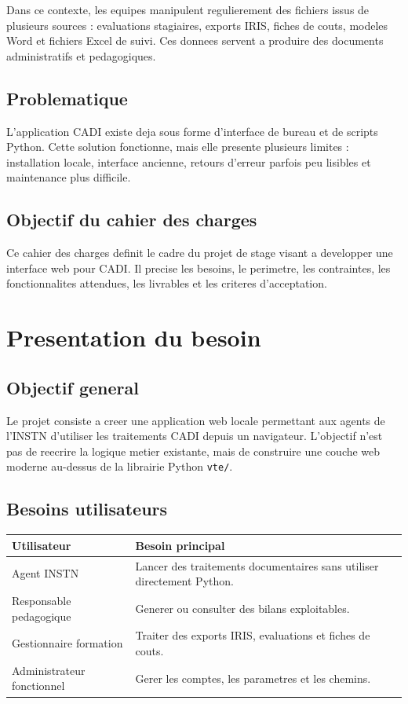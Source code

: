 \documentclass[11pt,a4paper]{report}
\begin{document}
Dans ce contexte, les equipes manipulent regulierement des fichiers issus de plusieurs sources : evaluations stagiaires, exports IRIS, fiches de couts, modeles Word et fichiers Excel de suivi. Ces donnees servent a produire des documents administratifs et pedagogiques.

\section{Problematique}
L'application CADI existe deja sous forme d'interface de bureau et de scripts Python. Cette solution fonctionne, mais elle presente plusieurs limites : installation locale, interface ancienne, retours d'erreur parfois peu lisibles et maintenance plus difficile.

\section{Objectif du cahier des charges}
Ce cahier des charges definit le cadre du projet de stage visant a developper une interface web pour CADI. Il precise les besoins, le perimetre, les contraintes, les fonctionnalites attendues, les livrables et les criteres d'acceptation.

\chapter{Presentation du besoin}

\section{Objectif general}
Le projet consiste a creer une application web locale permettant aux agents de l'INSTN d'utiliser les traitements CADI depuis un navigateur. L'objectif n'est pas de reecrire la logique metier existante, mais de construire une couche web moderne au-dessus de la librairie Python \texttt{vte/}.

\section{Besoins utilisateurs}
\begin{longtable}{L{0.28\textwidth} L{0.62\textwidth}}
\toprule
{}
\textbf{Utilisateur} & \textbf{Besoin principal} \\
\midrule
Agent INSTN & Lancer des traitements documentaires sans utiliser directement Python. \\
Responsable pedagogique & Generer ou consulter des bilans exploitables. \\
Gestionnaire formation & Traiter des exports IRIS, evaluations et fiches de couts. \\
Administrateur fonctionnel & Gerer les comptes, les parametres et les chemins. \\
\bottomrule
\end{longtable}
\end{document}
